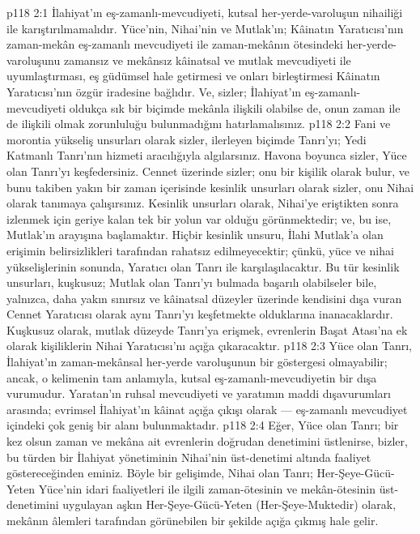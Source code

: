\vs p118 2:1 İlahiyat’ın eş\hyp{}zamanlı\hyp{}mevcudiyeti, kutsal her\hyp{}yerde\hyp{}varoluşun nihailiği ile karıştırılmamalıdır. Yüce’nin, Nihai’nin ve Mutlak’ın; Kâinatın Yaratıcısı’nın zaman\hyp{}mekân eş\hyp{}zamanlı mevcudiyeti ile zaman\hyp{}mekânın ötesindeki her\hyp{}yerde\hyp{}varoluşunu zamansız ve mekânsız kâinatsal ve mutlak mevcudiyeti ile uyumlaştırması, eş güdümsel hale getirmesi ve onları birleştirmesi Kâinatın Yaratıcısı’nın özgür iradesine bağlıdır. Ve, sizler; İlahiyat’ın eş\hyp{}zamanlı\hyp{}mevcudiyeti oldukça sık bir biçimde mekânla ilişkili olabilse de, onun zaman ile de ilişkili olmak zorunluluğu bulunmadığını hatırlamalısınız.
\vs p118 2:2 Fani ve morontia yükseliş unsurları olarak sizler, ilerleyen biçimde Tanrı’yı; Yedi Katmanlı Tanrı’nın hizmeti aracılığıyla algılarsınız. Havona boyunca sizler, Yüce olan Tanrı’yı keşfedersiniz. Cennet üzerinde sizler; onu bir kişilik olarak bulur, ve bunu takiben yakın bir zaman içerisinde kesinlik unsurları olarak sizler, onu Nihai olarak tanımaya çalışırsınız. Kesinlik unsurları olarak, Nihai’ye eriştikten sonra izlenmek için geriye kalan tek bir yolun var olduğu görünmektedir; ve, bu ise, Mutlak’ın arayışına başlamaktır. Hiçbir kesinlik unsuru, İlahi Mutlak’a olan erişimin belirsizlikleri tarafından rahatsız edilmeyecektir; çünkü, yüce ve nihai yükselişlerinin sonunda, Yaratıcı olan Tanrı ile karşılaşılacaktır. Bu tür kesinlik unsurları, kuşkusuz; Mutlak olan Tanrı’yı bulmada başarılı olabilseler bile, yalnızca, daha yakın sınırsız ve kâinatsal düzeyler üzerinde kendisini dışa vuran Cennet Yaratıcısı olarak aynı Tanrı’yı keşfetmekte olduklarına inanacaklardır. Kuşkusuz olarak, mutlak düzeyde Tanrı’ya erişmek, evrenlerin Başat Atası’na ek olarak kişiliklerin Nihai Yaratıcısı’nı açığa çıkaracaktır.
\vs p118 2:3 Yüce olan Tanrı, İlahiyat’ın zaman\hyp{}mekânsal her\hyp{}yerde varoluşunun bir göstergesi olmayabilir; ancak, o kelimenin tam anlamıyla, kutsal eş\hyp{}zamanlı\hyp{}mevcudiyetin bir dışa vurumudur. Yaratan’ın ruhsal mevcudiyeti ve yaratımın maddi dışavurumları arasında; evrimsel İlahiyat’ın kâinat açığa çıkışı olarak --- eş\hyp{}zamanlı mevcudiyet içindeki  çok geniş bir alanı bulunmaktadır.
\vs p118 2:4 Eğer, Yüce olan Tanrı; bir kez olsun zaman ve mekâna ait evrenlerin doğrudan denetimini üstlenirse, bizler, bu türden bir İlahiyat yönetiminin Nihai’nin üst\hyp{}denetimi altında faaliyet göstereceğinden eminiz. Böyle bir gelişimde, Nihai olan Tanrı; Her\hyp{}Şeye\hyp{}Gücü\hyp{}Yeten Yüce’nin idari faaliyetleri ile ilgili zaman\hyp{}ötesinin ve mekân\hyp{}ötesinin üst\hyp{}denetimini uygulayan aşkın Her\hyp{}Şeye\hyp{}Gücü\hyp{}Yeten (Her\hyp{}Şeye\hyp{}Muktedir) olarak, mekânın âlemleri tarafından görünebilen bir şekilde açığa çıkmış hale gelir.
